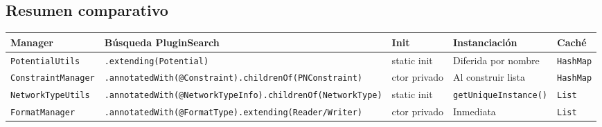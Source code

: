 \documentclass[12pt,a4paper,spanish]{article}
\begin{document}
\subsection{Resumen comparativo}

\bigskip
\begin{tabularx}{\textwidth}{lXlll}
\toprule
\textbf{Manager} & \textbf{Búsqueda PluginSearch} & \textbf{Init} & \textbf{Instanciación} & \textbf{Caché} \\
\midrule
\texttt{PotentialUtils}    & \texttt{.extending(Potential)}             & static init & Diferida por nombre & \texttt{HashMap} \\
\texttt{ConstraintManager} & \texttt{.annotatedWith(@Constraint)}\newline\texttt{.childrenOf(PNConstraint)} & ctor privado & Al construir lista & \texttt{HashMap} \\
\texttt{NetworkTypeUtils}  & \texttt{.annotatedWith(@NetworkTypeInfo)}\newline\texttt{.childrenOf(NetworkType)} & static init & \texttt{getUniqueInstance()} & \texttt{List} \\
\texttt{FormatManager}     & \texttt{.annotatedWith(@FormatType)}\newline\texttt{.extending(Reader/Writer)} & ctor privado & Inmediata & \texttt{List} \\
\bottomrule
\end{tabularx}
\end{document}
